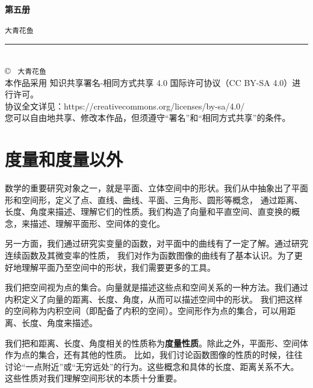 \documentclass[12pt,UTF8,fontset=none]{ctexbook}
\newcommand{\mytitle}{第五册}
\newcommand{\myauthor}{大青花鱼}
\begin{document}
\cleardoublepage                %
\thispagestyle{empty}           %
\begin{center}
    \vspace*{2cm}               %
    
    { \bfseries \mytitle}
    
    \vspace{1cm}              %
    
    { \texttt{\myauthor}}
    
    \vfill                      %
    
    \rule{0.5\textwidth}{0.4pt} \\[0.5cm]
    
    {\scriptsize
    \copyright\ \the\year{} \texttt{\myauthor} \\[0.2cm]
    本作品采用 知识共享署名-相同方式共享 4.0 国际许可协议（CC BY-SA 4.0）进行许可。\\
    协议全文详见：https://creativecommons.org/licenses/by-sa/4.0/ \\
    您可以自由地共享、修改本作品，但须遵守“署名”和“相同方式共享”的条件。
    }
\end{center}
\newpage   
\tableofcontents
\newpage

\chapter{度量和度量以外}

数学的重要研究对象之一，就是平面、立体空间中的形状。我们从中抽象出了平面形和空间形，定义了点、直线、曲线、平面、三角形、圆形等概念，
通过距离、长度、角度来描述、理解它们的性质。我们构造了向量和平直空间、直变换的概念，来描述、理解平面形、空间体的变化。

另一方面，我们通过研究实变量的函数，对平面中的曲线有了一定了解。通过研究连续函数及其微变率的性质，
我们对作为函数图像的曲线有了基本认识。为了更好地理解平面乃至空间中的形状，我们需要更多的工具。

我们把空间视为点的集合。向量就是描述这些点和空间关系的一种方法。我们通过内积定义了向量的距离、长度、角度，从而可以描述空间中的形状。
我们把这样的空间称为内积空间（即配备了内积的空间）。空间形作为点的集合，可以用距离、长度、角度来描述。

我们把和距离、长度、角度相关的性质称为\textbf{度量性质}。除此之外，平面形、空间体作为点的集合，还有其他的性质。
比如，我们讨论函数图像的性质的时候，往往讨论“一点附近”或“无穷远处”的行为。这些概念和具体的长度、距离关系不大。
这些性质对我们理解空间形状的本质十分重要。
\end{document}

